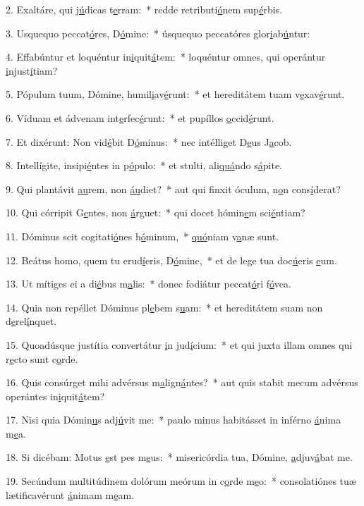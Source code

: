 2. Exaltáre, qui j\uline{ú}dicas t\uline{e}rram:~* redde retributi\uline{ó}nem sup\uline{é}rbis.\par 
3. Usquequo peccat\uline{ó}res, D\uline{ó}mine:~* úsquequo peccatóres glor\uline{i}ab\uline{ú}ntur:\par 
4. Effabúntur et loquéntur in\uline{i}quit\uline{á}tem:~* loquéntur omnes, qui operántur \uline{i}njust\uline{í}tiam?\par 
5. Pópulum tuum, Dómine, humil\uline{i}av\uline{é}runt:~* et hereditátem tuam v\uline{e}xav\uline{é}runt.\par 
6. Víduam et ádvenam int\uline{e}rfec\uline{é}runt:~* et pupíllos \uline{o}ccid\uline{é}runt.\par 
7. Et dixérunt: Non vid\uline{é}bit D\uline{ó}minus:~* nec intélliget D\uline{e}us J\uline{a}cob.\par 
8. Intellígite, insipi\uline{é}ntes in p\uline{ó}pulo:~* et stulti, ali\uline{quá}ndo s\uline{á}pite.\par 
9. Qui plantávit \uline{au}rem, non \uline{áu}diet?~* aut qui finxit óculum, n\uline{o}n cons\uline{í}derat?\par 
10. Qui córripit G\uline{e}ntes, non \uline{á}rguet:~* qui docet hómin\uline{e}m sci\uline{é}ntiam?\par 
11. Dóminus scit cogitati\uline{ó}nes h\uline{ó}minum,~* \uline{quó}niam v\uline{a}næ sunt.\par 
12. Beátus homo, quem tu erud\uline{í}eris, D\uline{ó}mine,~* et de lege tua doc\uline{ú}eris \uline{e}um.\par 
13. Ut mítiges ei a di\uline{é}bus m\uline{a}lis:~* donec fodiátur peccat\uline{ó}ri f\uline{ó}vea.\par 
14. Quia non repéllet Dóminus pl\uline{e}bem s\uline{u}am:~* et hereditátem suam non d\uline{e}rel\uline{í}nquet.\par 
15. Quoadúsque justítia convertátur \uline{i}n jud\uline{í}cium:~* et qui juxta illam omnes qui r\uline{e}cto sunt c\uline{o}rde.\par 
16. Quis consúrget mihi advérsus m\uline{a}lign\uline{á}ntes?~* aut quis stabit mecum advérsus operántes in\uline{i}quit\uline{á}tem?\par 
17. Nisi quia Dómin\uline{u}s adj\uline{ú}vit me:~* paulo minus habitásset in inférno \uline{á}nima m\uline{e}a.\par 
18. Si dicébam: Motus \uline{e}st pes m\uline{e}us:~* misericórdia tua, Dómine, \uline{a}djuv\uline{á}bat me.\par 
19. Secúndum multitúdinem dolórum meórum in c\uline{o}rde m\uline{e}o:~* consolatiónes tuæ lætificavérunt \uline{á}nimam m\uline{e}am.\par 
